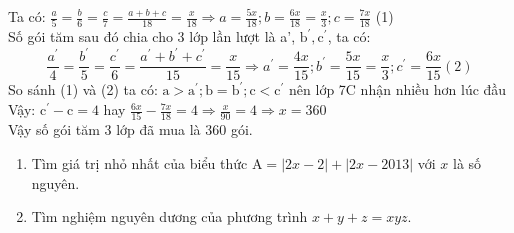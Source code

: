 \begin{bt}
{\begin{enumerate}
			Ta có: $\frac{a}{5}=\frac{b}{6}=\frac{c}{7}=\frac{a+b+c}{18}=\frac{x}{18} \Rightarrow a=\frac{5 x}{18} ; b=\frac{6 x}{18}=\frac{x}{3} ; c=\frac{7 x}{18}$ (1)\\
			Số gói tăm sau đó chia cho 3 lớp lần lượt là a', $\mathrm{b}^{\prime}, \mathrm{c}^{\prime}$, ta có:
			$$
			\frac{a^{\prime}}{4}=\frac{b^{\prime}}{5}=\frac{c^{\prime}}{6}=\frac{a^{\prime}+b^{\prime}+c^{\prime}}{15}=\frac{x}{15} \Rightarrow a^{\prime}=\frac{4 x}{15} ; b^{\prime}=\frac{5 x}{15}=\frac{x}{3} ; c^{\prime}=\frac{6 x}{15} (2)
			$$
			So sánh (1) và (2) ta có: $\mathrm{a}>\mathrm{a}^{\prime} ; \mathrm{b}=\mathrm{b}^{\prime} ; \mathrm{c}<\mathrm{c}^{\prime}$ nên lớp 7C nhận nhiều hơn lúc đầu\\
			 Vậy: $\mathrm{c}^{\prime}-\mathrm{c}=4$ hay $\frac{6 x}{15}-\frac{7 x}{18}=4 \Rightarrow \frac{x}{90}=4 \Rightarrow x=360$\\
			Vậy số gói tăm 3 lớp đã mua là 360 gói.
		\end{enumerate}
	} 
\end{bt}

\begin{bt}
	\hfill
	\begin{enumerate}[1.]
		\item Tìm giá trị nhỏ nhất của biểu thức $\mathrm{A}=|2 x-2|+|2 x-2013|$ với $x$ là số nguyên.
		\item Tìm nghiệm nguyên dương của phương trình $x+y+z=x y z$.
	\end{enumerate}
\end{bt}

